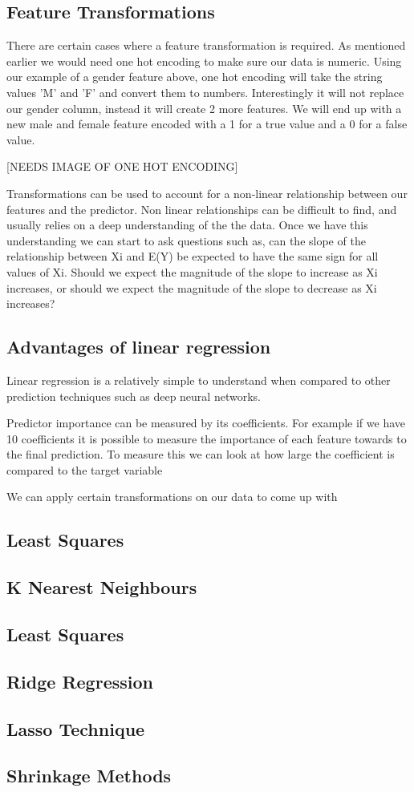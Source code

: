\subsection*{Feature Transformations}

There are certain cases where a feature transformation is required. As mentioned earlier we would need one hot encoding to make sure our data is numeric. Using our example of a gender feature above, one hot encoding will take the string values 'M' and 'F' and convert them to numbers. Interestingly it will not replace our gender column, instead it will create 2 more features. We will end up with a new male and female feature encoded with a 1 for a true value and a 0 for a false value.\cite{nonlinear_relationships}

[NEEDS IMAGE OF ONE HOT ENCODING]

Transformations can be used to account for a non-linear relationship between our features and the predictor. Non linear relationships can be difficult to find, and usually relies on a deep understanding of the the data. Once we have this understanding we can start to ask questions such as, can the slope of
the relationship between Xi and E(Y) be expected to have the same sign for all values of Xi. Should we expect the magnitude of the slope to increase as Xi increases, or should we expect
the magnitude of the slope to decrease as Xi increases?\cite{nonlinear_relationships}

\subsection*{Advantages of linear regression}

Linear regression is a relatively simple to understand when compared to other prediction techniques such as deep neural networks.

Predictor importance can be measured by its coefficients. For example if we have 10 coefficients it is possible to measure the importance of each feature towards to the final prediction. To measure this we can look at how large the coefficient is compared to the target variable

We can apply certain transformations on our data to come up with 


\subsection*{Least Squares}
\subsection*{K Nearest Neighbours}
\subsection*{Least Squares}
\subsection*{Ridge Regression}
\subsection*{Lasso Technique}

\subsection*{Shrinkage Methods}